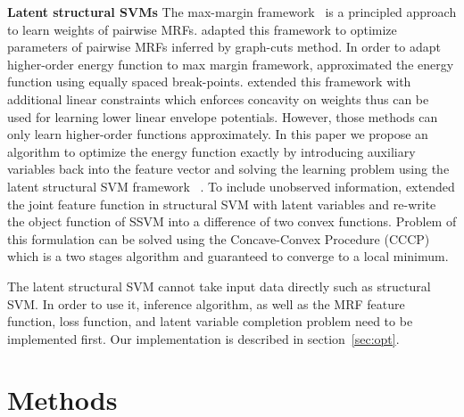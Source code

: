 \documentclass[sigconf]{acmart}
\renewcommand{\citename}{\citet}
\renewcommand{\cite}{\citep}
\begin{document}
\textbf{Latent structural SVMs} The max-margin
framework~\cite{Taskar:ICML05,tsochantaridis2005large} is a
principled approach to learn weights of pairwise MRFs.
\citename{Szummer:ECCV08} adapted this framework to optimize
parameters of pairwise MRFs inferred by graph-cuts method. In
order to adapt higher-order energy function to max margin
framework, \citename{Gould:ICML2011} approximated the energy
function using equally spaced break-points.
\citename{gouldlearning} extended this framework with additional
linear constraints which enforces concavity on weights thus can
be used for learning lower linear envelope potentials. However,
those methods can only learn higher-order functions
approximately. In this paper we propose an algorithm to optimize
the energy function exactly by introducing auxiliary variables
back into the feature vector and solving the learning problem
using the latent structural SVM framework
~\cite{yu2009learning}. To include unobserved information,
\citename{yu2009learning} extended the joint feature function in
structural SVM with latent variables and re-write the object
function of SSVM into a difference of two convex functions.
Problem of this formulation can be solved using the
Concave-Convex Procedure (CCCP)\cite{yuille2002concave} which is
a two stages algorithm and guaranteed to converge to a local
minimum.


The latent structural SVM cannot take input data directly such
as structural SVM. In order to use it, inference algorithm, as
well as the MRF feature function, loss function, and latent
variable completion problem\cite{yu2009learning} need to be
implemented first. Our implementation is described in
section~\ref{sec:opt}.


\section{Methods}
\label{sec:meth}
\end{document}
